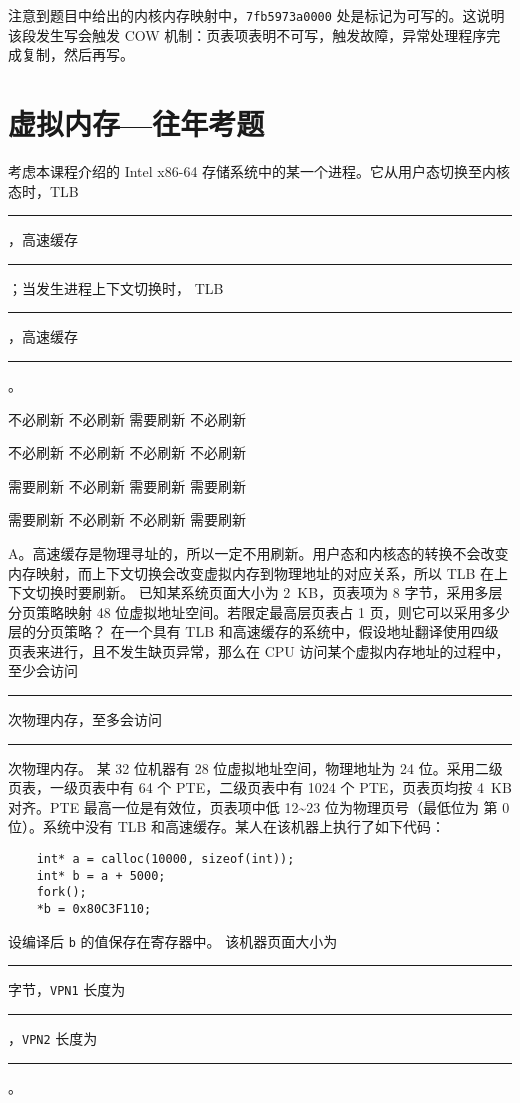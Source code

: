 \begin{problems}
        注意到题目中给出的内核内存映射中，\verb|7fb5973a0000| 处是标记为可写的。这说明该段发生写会触发 COW 机制：页表项表明不可写，触发故障，异常处理程序完成复制，然后再写。
    \end{problems}

\chapter{虚拟内存{---}往年考题}\thispagestyle{empty}
    \begin{problems}
         考虑本课程介绍的 Intel x86-64 存储系统中的某一个进程。它从用户态切换至内核态时，TLB \rule{2.5cm}{0.25mm}，高速缓存 \rule{2.5cm}{0.25mm}；当发生进程上下文切换时， TLB \rule{2.5cm}{0.25mm}，高速缓存 \rule{2.5cm}{0.25mm}。
        \begin{choices}
            \item 不必刷新 \quad 不必刷新 \quad 需要刷新 \quad 不必刷新
            \item 不必刷新 \quad 不必刷新 \quad 不必刷新 \quad 不必刷新
            \item 需要刷新 \quad 不必刷新 \quad 需要刷新 \quad 需要刷新
            \item 需要刷新 \quad 不必刷新 \quad 不必刷新 \quad 需要刷新
        \end{choices}
        \sol A。高速缓存是物理寻址的，所以一定不用刷新。用户态和内核态的转换不会改变内存映射，而上下文切换会改变虚拟内存到物理地址的对应关系，所以 TLB 在上下文切换时要刷新。
         已知某系统页面大小为 \SI{2}{KB}，页表项为 8 字节，采用多层分页策略映射 48 位虚拟地址空间。若限定最高层页表占 1 页，则它可以采用多少层的分页策略？
         在一个具有 TLB 和高速缓存的系统中，假设地址翻译使用四级页表来进行，且不发生缺页异常，那么在 CPU 访问某个虚拟内存地址的过程中，至少会访问 \rule{2.5cm}{0.25mm} 次物理内存，至多会访问 \rule{2.5cm}{0.25mm} 次物理内存。
         某 32 位机器有 28 位虚拟地址空间，物理地址为 24 位。采用二级页表，一级页表中有 64 个 PTE，二级页表中有 1024 个 PTE，页表页均按 \SI{4}{KB} 对齐。PTE 最高一位是有效位，页表项中低 12\textasciitilde 23 位为物理页号（最低位为 第 0 位）。系统中没有 TLB 和高速缓存。某人在该机器上执行了如下代码：
        \begin{verbatim}
    int* a = calloc(10000, sizeof(int));
    int* b = a + 5000;
    fork();
    *b = 0x80C3F110;
        \end{verbatim}
        设编译后 \verb|b| 的值保存在寄存器中。
        \qn 该机器页面大小为 \rule{2.5cm}{0.25mm} 字节，\verb|VPN1| 长度为 \rule{2.5cm}{0.25mm}，\verb|VPN2| 长度为 \rule{2.5cm}{0.25mm}。

\end{problems}
